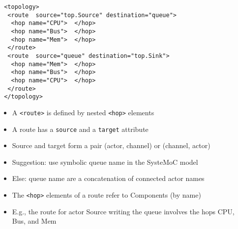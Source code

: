 \begin{frame}[fragile=singleslide]
\begin{lstlisting}
 <topology>
  <route  source="top.Source" destination="queue">
   <hop name="CPU">  </hop>
   <hop name="Bus">  </hop>
   <hop name="Mem">  </hop>
  </route>
  <route  source="queue" destination="top.Sink">
   <hop name="Mem">  </hop>
   <hop name="Bus">  </hop>
   <hop name="CPU">  </hop>
  </route>
 </topology>
\end{lstlisting}
\begin{itemize}
\item A \lstinline!<route>! is defined by nested \lstinline!<hop>! elements
\item A route has a \lstinline!source! and a \lstinline!target! attribute
\item Source and target form a pair (actor, channel) or (channel, actor)
\item Suggestion: use symbolic queue name in the SysteMoC model
\item Else: queue name are a concatenation of connected actor names
\end{itemize}
\end{frame}

\begin{frame}[t]
\begin{figure}
\centering
\resizebox{0.7\columnwidth}{!}{}
\end{figure}

\begin{itemize}
\item The \lstinline!<hop>! elements of a route refer to Components (by name)
\item E.g., the route for actor Source writing the queue involves the hops CPU, Bus, and Mem
\end{itemize}

\end{frame}




